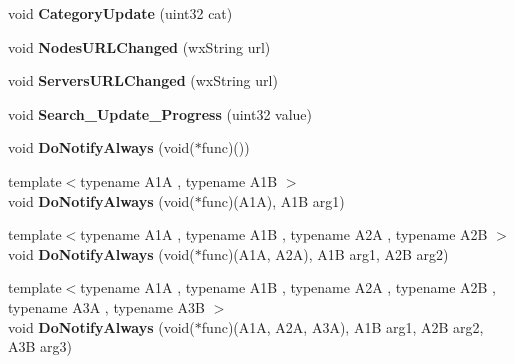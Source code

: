 \begin{DoxyCompactItemize}
\item 
void {\bfseries CategoryUpdate} (uint32 cat)\label{namespaceMuleNotify_ad7821512e5b739a99e7b34cc9d86e707}

\item 
void {\bfseries NodesURLChanged} (wxString url)\label{namespaceMuleNotify_af960e59eb956f673833d9cb799b6a4b9}

\item 
void {\bfseries ServersURLChanged} (wxString url)\label{namespaceMuleNotify_ae27ae626f78899711b03b9c77e7ad336}

\item 
void {\bfseries Search\_\-Update\_\-Progress} (uint32 value)\label{namespaceMuleNotify_a22d2c5caa9cc685dc7c26d7df9486080}

\item 
void {\bfseries DoNotifyAlways} (void($\ast$func)())\label{namespaceMuleNotify_ac996b0459dc2e9131fe3f6af92ec6c94}

\item 
{\footnotesize template$<$typename A1A , typename A1B $>$ }\\void {\bfseries DoNotifyAlways} (void($\ast$func)(A1A), A1B arg1)\label{namespaceMuleNotify_a6d9315477990ab65798d5e900a542586}

\item 
{\footnotesize template$<$typename A1A , typename A1B , typename A2A , typename A2B $>$ }\\void {\bfseries DoNotifyAlways} (void($\ast$func)(A1A, A2A), A1B arg1, A2B arg2)\label{namespaceMuleNotify_aa1c7fec95b441e0abc541ce6aa9614d7}

\item 
{\footnotesize template$<$typename A1A , typename A1B , typename A2A , typename A2B , typename A3A , typename A3B $>$ }\\void {\bfseries DoNotifyAlways} (void($\ast$func)(A1A, A2A, A3A), A1B arg1, A2B arg2, A3B arg3)\label{namespaceMuleNotify_a60c7f55f865531160c23f8329d2a79e7}

\end{DoxyCompactItemize}
